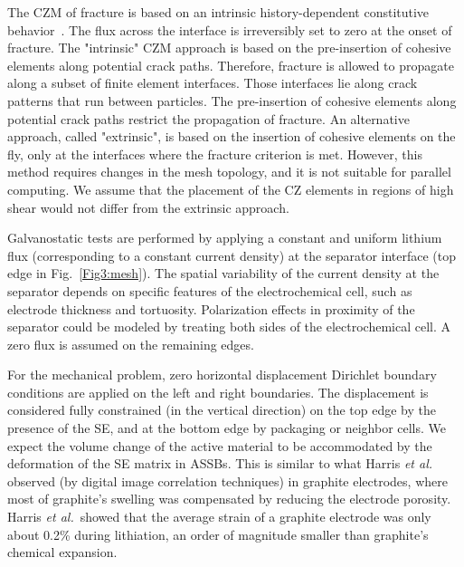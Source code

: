 \documentclass[final,5p,sort&compress]{elsarticle}
\begin{document}
The CZM of fracture is based on an intrinsic history-dependent constitutive behavior~\cite{bucci2016book}.
The flux across the interface is irreversibly set to zero at the onset of fracture.
%
%
The "intrinsic" CZM approach is based on the pre-insertion of cohesive elements along potential crack paths.
Therefore, fracture is allowed to propagate along a subset of finite element interfaces. Those interfaces lie along crack patterns that run between particles.
The pre-insertion of cohesive elements along potential crack paths restrict the propagation of fracture.
An alternative approach, called "extrinsic", is based on the insertion of cohesive elements on the fly, only at the interfaces where the fracture criterion is met. However, this method requires changes in the mesh topology, and it is not suitable for parallel computing. 
We assume that the placement of the CZ elements in regions of high shear would not differ from the extrinsic approach.

%

Galvanostatic tests are performed by applying a constant and uniform  lithium flux (corresponding to a constant current density) at the separator interface (top edge in Fig.~\ref{Fig3:mesh}). 
The spatial variability of the current density at the separator depends on specific features of the electrochemical cell, such as electrode thickness and tortuosity.
Polarization effects in proximity of the separator could be modeled by treating both sides of the electrochemical cell.
A zero flux is assumed on the remaining edges.


For the mechanical problem, zero horizontal displacement Dirichlet boundary conditions are applied on the left and right boundaries.
%
The displacement is considered fully constrained (in the vertical direction) on the top edge by the presence of the SE, and at the bottom edge by packaging or neighbor cells. 
We expect the volume change of the active material to be accommodated by the deformation of the SE matrix in ASSBs.
%
This is similar to what Harris \emph{et al.}~\cite{Harris2013} observed (by
digital image correlation techniques) in graphite electrodes, where most
of graphite's swelling was compensated by reducing the electrode porosity.
Harris \emph{et al.}~showed that the average strain of a graphite electrode was only about 0.2\% during lithiation, an order of magnitude smaller than graphite's chemical expansion. 
\end{document}
